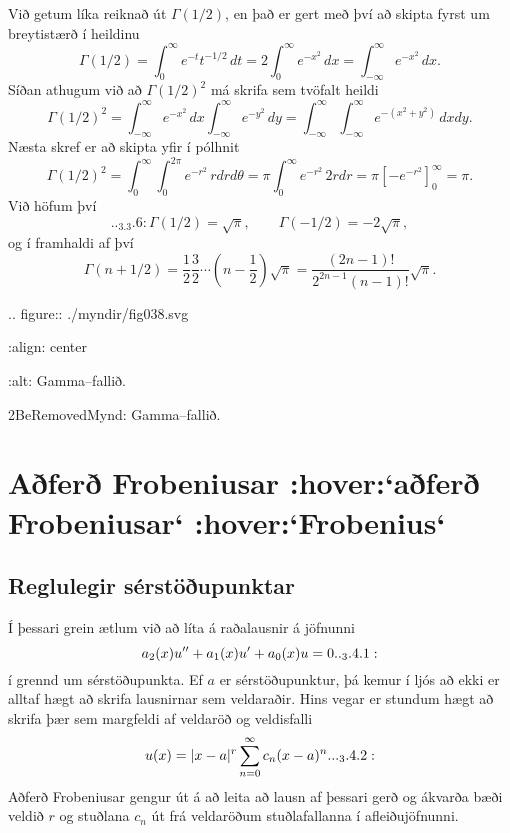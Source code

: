 Við getum líka reiknað  út $\Gamma(1/2)$, en það er gert með því
að skipta fyrst um breytistærð í heildinu
 $$\Gamma(1/2)=\int_0^\infty e^{-t}t^{-1/2}\, dt =
2\int_0^\infty e^{-x^2}\, dx= \int_{-\infty}^\infty e^{-x^2}\, dx.
 $$
Síðan athugum við að $\Gamma(1/2)^2$ má skrifa sem tvöfalt heildi
 $$\Gamma(1/2)^2= 
\int_{-\infty}^\infty e^{-x^2}\, dx\int_{-\infty}^\infty e^{-y^2}\,dy=
\int_{-\infty}^\infty \int_{-\infty}^\infty e^{-(x^2+y^2)}\, dxdy.
 $$
Næsta skref er að skipta yfir í pólhnit
 $$\Gamma(1/2)^2=\int_0^\infty\int_0^{2\pi}e^{-r^2} \, rdrd\theta =
\pi \int_0^\infty e^{-r^2} \, 2rdr= \pi\left[-e^{-r^2}\right]_0^\infty=\pi.
 $$
Við höfum því 
 \begin{equation*}

.. _3.3.6:

\Gamma(1/2)=\sqrt\pi, \qquad \Gamma(-1/2)=-2\sqrt\pi,
 \end{equation*}
og í framhaldi af því 
 $$\Gamma(n+1/2) =\frac 12\frac 32\cdots (n-\frac 12)\sqrt \pi=
\dfrac{(2n-1)!}{2^{2n-1}(n-1)!}\sqrt \pi.
 $$

.. figure:: ./myndir/fig038.svg

    :align: center

    :alt: Gamma--fallið.

    2BeRemovedMynd: Gamma--fallið.





\section{Aðferð Frobeniusar :hover:`aðferð Frobeniusar` :hover:`Frobenius`}


\subsection*{Reglulegir sérstöðupunktar}

Í þessari grein ætlum við að líta á raðalausnir á jöfnunni
 \begin{equation*}a_2(x)u\ddash+a_1(x)u\dash+a_0(x) u=0


.. _3.4.1:

 \end{equation*}
í grennd um sérstöðupunkta.  Ef $a$ er sérstöðupunktur, þá kemur í
ljós að ekki er alltaf hægt að skrifa lausnirnar sem veldaraðir.
Hins vegar er stundum hægt að skrifa  þær sem margfeldi af veldaröð
og veldisfalli
 \begin{equation*}u(x)= |x-a|\sp r\sum_{n=0}\sp \infty c_n(x-a)\sp n.


.. _3.4.2:

 \end{equation*}
Aðferð Frobeniusar gengur út á að leita að lausn af þessari gerð og
ákvarða bæði veldið $r$ og stuðlana $c_n$ út frá veldaröðum
stuðlafallanna í afleiðujöfnunni.

